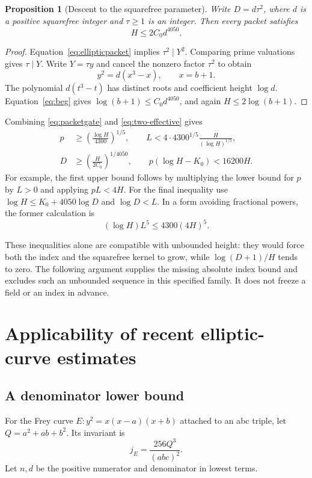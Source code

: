 \documentclass[11pt]{amsart}
\newtheorem{proposition}[theorem]{Proposition}
\theoremstyle{definition}
\theoremstyle{remark}
\begin{document}
\begin{proposition}[Descent to the squarefree parameter]\label{prop:descent}
Write $D=d\tau^2$, where $d$ is a positive squarefree integer and
$\tau\ge1$ is an integer. Then every packet satisfies
\[
 H\le2C_0d^{4050}.
\]
\end{proposition}
\begin{proof}
Equation~\eqref{eq:ellipticpacket} implies $\tau^2\mid Y^2$.
Comparing prime valuations gives $\tau\mid Y$. Write $Y=\tau y$ and
cancel the nonzero factor $\tau^2$ to obtain
\[
 y^2=d(x^3-x),\qquad x=b+1.
\]
The polynomial $d(t^3-t)$ has distinct roots and coefficient height
$\log d$. Equation~\eqref{eq:beg} gives
$\log(b+1)\le C_0d^{4050}$, and again $H\le2\log(b+1)$.
\end{proof}

Combining \eqref{eq:packetgate} and \eqref{eq:two-effective} gives
\begin{align}
 p&\ge\left(\frac{\log H}{4300}\right)^{1/5},\qquad
 L<4\cdot4300^{1/5}\frac{H}{(\log H)^{1/5}},\label{eq:uppercorr}\\
 D&\ge\left(\frac{H}{2C_0}\right)^{1/4050},\qquad
 p(\log H-K_0)<16200H.\label{eq:lowercorr}
\end{align}
For example, the first upper bound follows by multiplying the lower bound
for $p$ by $L>0$ and applying $pL<4H$.
For the final inequality use
$\log H\le K_0+4050\log D$ and $\log D<L$.
In a form avoiding fractional powers, the former calculation is
\[
 (\log H)L^5\le4300(4H)^5.
\]

These inequalities alone are compatible with unbounded height: they would
force both the index and the squarefree kernel to grow, while
$\log(D+1)/H$ tends to zero. The following argument supplies the missing
absolute index bound and excludes such an unbounded sequence in this
specified family. It does not freeze a field or an index in advance.





\section{Applicability of recent elliptic-curve estimates}\label{sec:frey}

\subsection{A denominator lower bound}
For the Frey curve $E:y^2=x(x-a)(x+b)$ attached to an abc triple, let
$Q=a^2+ab+b^2$. Its invariant is
\[
 j_E=\frac{256Q^3}{(abc)^2}.
\]
Let $n,d$ be the positive numerator and denominator in lowest terms.
\end{document}
